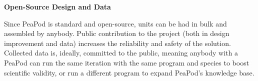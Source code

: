 
\textbf{Open-Source Design and Data}

Since PeaPod is standard and open-source, units can be had in bulk and assembled by anybody. Public contribution to the project (both in design improvement and data) increases the reliability and safety of the solution. Collected data is, ideally, committed to the public, meaning anybody with a PeaPod can run the same iteration with the same program and species to boost scientific validity, or run a different program to expand PeaPod's knowledge base.
